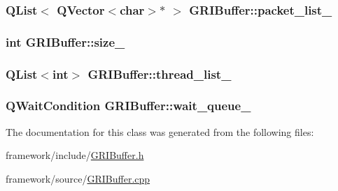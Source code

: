 \hypertarget{classGRIBuffer_a47531e513e5783b3739c9ea857b8c229}{
\subsubsection[{packet\-\_\-list\-\_\-}]{\setlength{\rightskip}{0pt plus 5cm}\-Q\-List$<$ \-Q\-Vector$<$char$>$$\ast$ $>$ {\bf \-G\-R\-I\-Buffer\-::packet\-\_\-list\-\_\-}}}\label{classGRIBuffer_a47531e513e5783b3739c9ea857b8c229}
\hypertarget{classGRIBuffer_a1c470491db373e112eb96a45b09ac12d}{
\subsubsection[{size\-\_\-}]{\setlength{\rightskip}{0pt plus 5cm}int {\bf \-G\-R\-I\-Buffer\-::size\-\_\-}}}\label{classGRIBuffer_a1c470491db373e112eb96a45b09ac12d}
\hypertarget{classGRIBuffer_aa0d22b7b8351092286eef843913e38b8}{
\subsubsection[{thread\-\_\-list\-\_\-}]{\setlength{\rightskip}{0pt plus 5cm}\-Q\-List$<$int$>$ {\bf \-G\-R\-I\-Buffer\-::thread\-\_\-list\-\_\-}}}\label{classGRIBuffer_aa0d22b7b8351092286eef843913e38b8}
\hypertarget{classGRIBuffer_acc7e6856998c0ad94da57a0b58f66438}{
\subsubsection[{wait\-\_\-queue\-\_\-}]{\setlength{\rightskip}{0pt plus 5cm}\-Q\-Wait\-Condition {\bf \-G\-R\-I\-Buffer\-::wait\-\_\-queue\-\_\-}}}\label{classGRIBuffer_acc7e6856998c0ad94da57a0b58f66438}


\-The documentation for this class was generated from the following files\-:\begin{DoxyCompactItemize}
\item 
framework/include/\hyperlink{GRIBuffer_8h}{\-G\-R\-I\-Buffer.\-h}\item 
framework/source/\hyperlink{GRIBuffer_8cpp}{\-G\-R\-I\-Buffer.\-cpp}\end{DoxyCompactItemize}
